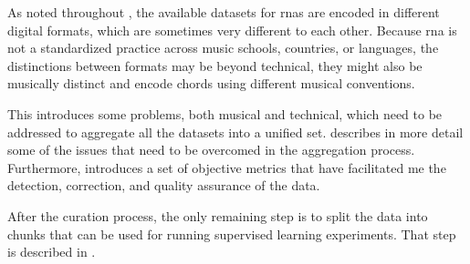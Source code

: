 
As noted throughout , the
available datasets for \glspl{rna} are encoded in different
digital formats, which are sometimes very different to each
other. Because \gls{rna} is not a standardized practice
across music schools, countries, or languages, the
distinctions between formats may be beyond technical, they
might also be musically distinct and encode chords using
different musical conventions.

This introduces some problems, both musical and technical,
which need to be addressed to aggregate all the datasets
into a unified set.
describes in more detail some of the issues that need to be
overcomed in the aggregation process. Furthermore,
 introduces a set of
objective metrics that have facilitated me the detection,
correction, and quality assurance of the data.

After the curation process, the only remaining step is to
split the data into chunks that can be used for running
supervised learning experiments. That step is described in
.
